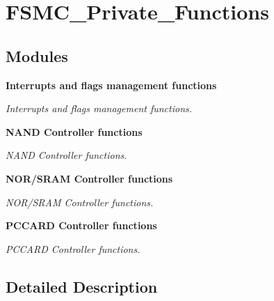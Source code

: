 \section{F\+S\+M\+C\+\_\+\+Private\+\_\+\+Functions}
\label{group__FSMC__Private__Functions}
\subsection*{Modules}
\begin{DoxyCompactItemize}
\item 
\textbf{ Interrupts and flags management functions}
\begin{DoxyCompactList}\small\item\em Interrupts and flags management functions. \end{DoxyCompactList}\item 
\textbf{ N\+A\+N\+D Controller functions}
\begin{DoxyCompactList}\small\item\em N\+A\+ND Controller functions. \end{DoxyCompactList}\item 
\textbf{ N\+O\+R/\+S\+R\+A\+M Controller functions}
\begin{DoxyCompactList}\small\item\em N\+O\+R/\+S\+R\+AM Controller functions. \end{DoxyCompactList}\item 
\textbf{ P\+C\+C\+A\+R\+D Controller functions}
\begin{DoxyCompactList}\small\item\em P\+C\+C\+A\+RD Controller functions. \end{DoxyCompactList}\end{DoxyCompactItemize}


\subsection{Detailed Description}
